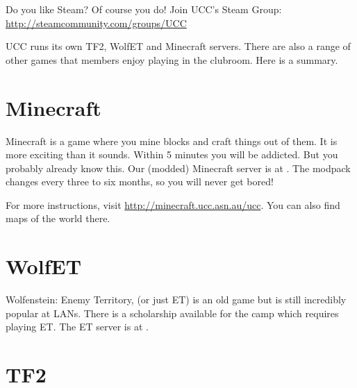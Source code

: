 \label{Games}

Do you like Steam? Of course you do! Join UCC's Steam Group: \url{http://steamcommunity.com/groups/UCC}

\noindent UCC runs its own TF2, WolfET and Minecraft servers.
There are also a range of other games that members enjoy playing in the clubroom. Here is a summary.

\section{Minecraft}

Minecraft is a game where you mine blocks and craft things out of them. It is more exciting than it sounds. Within 5 minutes you will be addicted. But you probably already know this. 
Our (modded) Minecraft server is at . The modpack changes every three to six months, so you will never get bored!

For more instructions, visit \url{http://minecraft.ucc.asn.au/ucc}. You can also find maps of the world there. %

\section{WolfET}

Wolfenstein: Enemy Territory, (or just ET) is an old game but is still incredibly popular at LANs. There is a scholarship  available for the camp which requires playing ET. The ET server is at .

\section{TF2}

